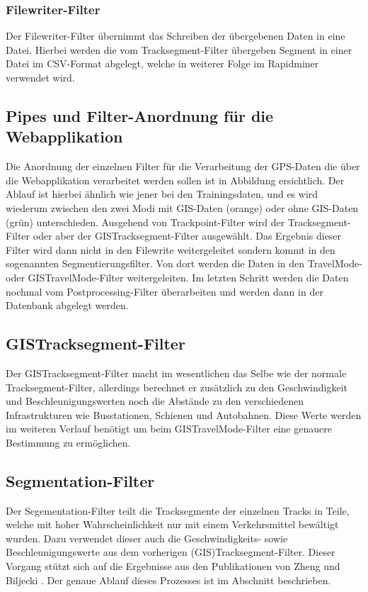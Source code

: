 \subsubsection{Filewriter-Filter}
Der Filewriter-Filter übernimmt das Schreiben der übergebenen Daten in eine Datei. Hierbei werden die vom Tracksegment-Filter übergeben Segment in einer Datei im CSV-Format abgelegt, welche in weiterer Folge im Rapidminer verwendet wird.

\subsection{Pipes und Filter-Anordnung für die Webapplikation}
Die Anordnung der einzelnen Filter für die Verarbeitung der GPS-Daten die über die Webapplikation verarbeitet werden sollen ist in Abbildung  ersichtlich. Der Ablauf ist hierbei ähnlich wie jener bei den Trainingsdaten, und es wird wiederum zwischen den zwei Modi mit GIS-Daten (orange) oder ohne GIS-Daten (grün) unterschieden. Ausgehend von Trackpoint-Filter wird der Tracksegment-Filter oder aber der GISTracksegment-Filter ausgewählt. Das Ergebnis dieser Filter wird dann nicht in den Filewrite weitergeleitet sondern kommt in den sogenannten Segmentierungsfilter. Von dort werden die Daten in den  TravelMode- oder GISTravelMode-Filter weitergeleiten. Im letzten Schritt werden die Daten nochmal vom Postprocessing-Filter überarbeiten und werden dann in der Datenbank abgelegt werden. 


\clearpage
\subsection{GISTracksegment-Filter}
\label{gisTracksegmentFilter}
Der GISTracksegment-Filter macht im wesentlichen das Selbe wie der normale Tracksegment-Filter, allerdings berechnet er zusätzlich zu den Geschwindigkeit und Beschleunigungswerten noch die Abstände zu den verschiedenen Infrastrukturen wie Busstationen, Schienen und Autobahnen. Diese Werte werden im weiteren Verlauf benötigt um beim GISTravelMode-Filter eine genauere Bestimmung zu ermöglichen.

\subsection{Segmentation-Filter}
Der Segementation-Filter teilt die Tracksegmente der einzelnen Tracks in Teile, welche mit hoher Wahrscheinlichkeit nur mit einem Verkehrsmittel bewältigt wurden. Dazu verwendet dieser auch die Geschwindigkeits- sowie Beschleunigungswerte aus dem vorherigen (GIS)Tracksegment-Filter. Dieser Vorgang stützt sich auf die Ergebnisse aus den Publikationen von Zheng \cite{zheng_understanding_2010} und Biljecki \cite{biljecki_transportation_2013}. Der genaue Ablauf dieses Prozesses ist im Abschnitt  beschrieben.

